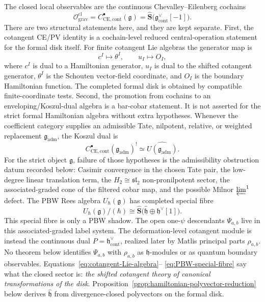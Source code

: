 \documentclass[11pt]{memoir}
\begin{document}
The closed local observables are the continuous Chevalley--Eilenberg
cochains
$$\mathcal{O}^{\mathrm{cl}}_{\mathrm{grav}}
  =C^\bullet_{\mathrm{CE},\mathrm{cont}}(\mathfrak g)
  =\widehat{\mathbf S}\bigl(\mathfrak g^\vee_{\mathrm{cont}}[-1]\bigr).$$
There are two structural statements here, and they are kept separate.
First, the cotangent CE/PV identity is a cochain-level reduced
central-operation statement for the formal disk itself.  For finite
cotangent Lie algebras
the generator map is
\[
  c^I\longmapsto\theta^I,\qquad u_I\longmapsto O_I,
\]
where \(c^I\) is dual to a Hamiltonian generator, \(u_I\) is dual to the
shifted cotangent generator, \(\theta^I\) is the Schouten vector-field
coordinate, and \(O_I\) is the boundary Hamiltonian function.  The
completed formal disk is obtained by compatible finite-coordinate tests.
Second, the promotion from cochains to an enveloping/Koszul-dual algebra
is a bar-cobar statement.  It is not asserted for the strict formal
Hamiltonian algebra without extra hypotheses. Whenever the coefficient
category supplies an admissible Tate, nilpotent, relative, or weighted
replacement \(\mathfrak g_{\mathrm{adm}}\), the Koszul dual is
\[
C^\bullet_{\mathrm{CE},\mathrm{cont}}(\mathfrak g_{\mathrm{adm}})^!
  \simeq \widehat{U(\mathfrak g_{\mathrm{adm}})}.
\]
For the strict object \(\mathfrak g\), failure of those hypotheses is the
admissibility obstruction datum recorded below:
Casimir convergence in the chosen Tate pair, the low-degree linear
translation term, the \(H_2\cong\mathfrak{sl}_2\) non-pronilpotent sector,
the associated-graded cone of the filtered cobar map, and the possible
Milnor \(\varprojlim^1\) defect.
The PBW Rees algebra $U_\hbar(\mathfrak g)$ has completed special fibre
\begin{equation}\label{eq:PBW-special-fibre}
U_\hbar(\mathfrak g)/(\hbar)
  \cong\widehat{\mathbf S}\bigl(\widehat{\mathfrak h}
    \oplus\mathfrak h^\vee[1]\bigr).
\end{equation}
This special fibre is only a PBW shadow.  The open one-\(\psi\)
descendants \(\Psi_{a,b}\) live in this associated-graded label system.
The deformation-level cotangent module is instead the continuous dual
\(P=\mathfrak h^\vee_{\mathrm{cont}}\), realized later by Matlis
principal parts \(\rho_{a,b}\).  No theorem below identifies
\(\Psi_{a,b}\) with \(\rho_{a,b}\) as \(\mathfrak h\)-modules or as
quantum boundary observables.
Equations~\eqref{eq:cotangent-Lie-algebra}--%
\eqref{eq:PBW-special-fibre} say what the closed sector is: \emph{the
shifted cotangent theory of canonical transformations of the disk}.
Proposition~\ref{prop:hamiltonian-polyvector-reduction} below derives
$\widehat{\mathfrak h}$ from divergence-closed polyvectors on the formal disk.
\end{document}
